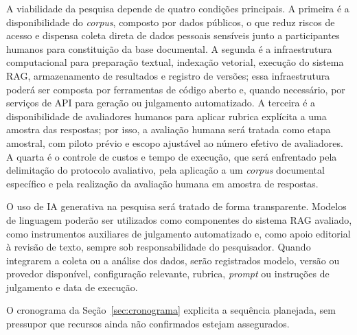 A viabilidade da pesquisa depende de quatro condições principais. A primeira é a disponibilidade do \textit{corpus}, composto por dados públicos, o que reduz riscos de acesso e dispensa coleta direta de dados pessoais sensíveis junto a participantes humanos para constituição da base documental. A segunda é a infraestrutura computacional para preparação textual, indexação vetorial, execução do sistema RAG, armazenamento de resultados e registro de versões; essa infraestrutura poderá ser composta por ferramentas de código aberto e, quando necessário, por serviços de API para geração ou julgamento automatizado. A terceira é a disponibilidade de avaliadores humanos para aplicar rubrica explícita a uma amostra das respostas; por isso, a avaliação humana será tratada como etapa amostral, com piloto prévio e escopo ajustável ao número efetivo de avaliadores. A quarta é o controle de custos e tempo de execução, que será enfrentado pela delimitação do protocolo avaliativo, pela aplicação a um \textit{corpus} documental específico e pela realização da avaliação humana em amostra de respostas.

O uso de IA generativa na pesquisa será tratado de forma transparente. Modelos de linguagem poderão ser utilizados como componentes do sistema RAG avaliado, como instrumentos auxiliares de julgamento automatizado e, como apoio editorial à revisão de texto, sempre sob responsabilidade do pesquisador. Quando integrarem a coleta ou a análise dos dados, serão registrados modelo, versão ou provedor disponível, configuração relevante, rubrica, \textit{prompt} ou instruções de julgamento e data de execução.

O cronograma da Seção~\ref{sec:cronograma} explicita a sequência planejada, sem pressupor que recursos ainda não confirmados estejam assegurados.
